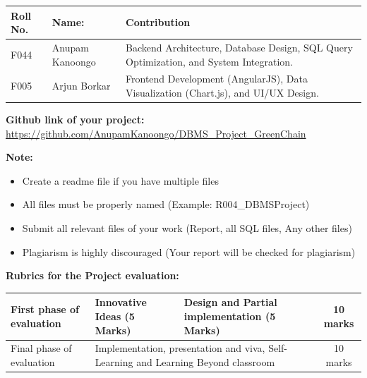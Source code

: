 \documentclass[12pt,a4paper]{article}
\begin{document}
\renewcommand{\arraystretch}{2}
\begin{tabularx}{\textwidth}{|l|l|X|}
    \hline
    \textbf{Roll No.} & \textbf{Name:} & \textbf{Contribution} \\ \hline
    F044 & Anupam Kanoongo & Backend Architecture, Database Design, SQL Query Optimization, and System Integration. \\ \hline
    F005 & Arjun Borkar & Frontend Development (AngularJS), Data Visualization (Chart.js), and UI/UX Design. \\ \hline
\end{tabularx}

\vfill
\noindent \textbf{\Large Github link of your project:} \\
\url{https://github.com/AnupamKanoongo/DBMS_Project_GreenChain}

\vspace{1.5cm}
\textbf{Note:}
\begin{itemize}[itemsep=10pt]
    \item Create a readme file if you have multiple files
    \item All files must be properly named (Example: R004\_DBMSProject)
    \item Submit all relevant files of your work (Report, all SQL files, Any other files)
    \item Plagiarism is highly discouraged (Your report will be checked for plagiarism)
\end{itemize}

\vspace{1cm}
\textbf{Rubrics for the Project evaluation:}
\begin{table}[h]
    \centering
    \renewcommand{\arraystretch}{1.5}
    \begin{tabular}{|p{4cm}|p{4cm}|p{4cm}|c|}
        \hline
        First phase of evaluation & Innovative Ideas (5 Marks) & Design and Partial implementation (5 Marks) & 10 marks \\ \hline
        Final phase of evaluation & \multicolumn{2}{p{8cm}|}{Implementation, presentation and viva, Self-Learning and Learning Beyond classroom} & 10 marks \\ \hline
    \end{tabular}
\end{table}

\newpage
\end{document}
